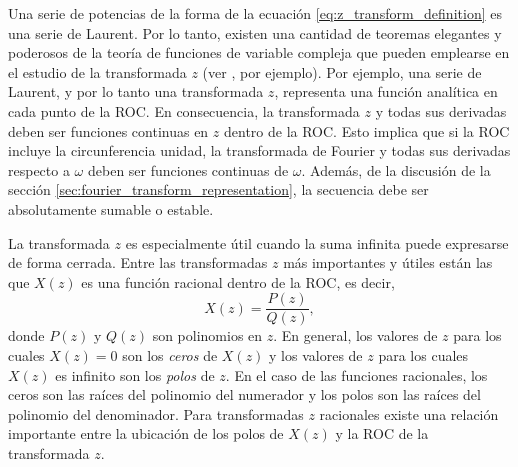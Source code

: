 \documentclass[a4paper]{report}
\begin{document}
Una serie de potencias de la forma de la ecuación \ref{eq:z_transform_definition} es una serie de Laurent. Por lo tanto, existen una cantidad de teoremas elegantes y poderosos de la teoría de funciones de variable compleja que pueden emplearse en el estudio de la transformada \(z\) (ver \cite{brown2013complex}, por ejemplo). Por ejemplo, una serie de Laurent, y por lo tanto una transformada \(z\), representa una función analítica en cada punto de la ROC. En consecuencia, la transformada \(z\) y todas sus derivadas deben ser funciones continuas en \(z\) dentro de la ROC. Esto implica que si la ROC incluye la circunferencia unidad, la transformada de Fourier y todas sus derivadas respecto a \(\omega\) deben ser funciones continuas de \(\omega\). Además, de la discusión de la sección \ref{sec:fourier_transform_representation}, la secuencia debe ser absolutamente sumable o estable.

La transformada \(z\) es especialmente útil cuando la suma infinita puede expresarse de forma cerrada. Entre las transformadas \(z\) más importantes y útiles están las que \(X(z)\) es una función racional dentro de la ROC, es decir,
\[
 X(z)=\frac{P(z)}{Q(z)},
\]
donde \(P(z)\) y \(Q(z)\) son polinomios en \(z\). En general, los valores de \(z\) para los cuales \(X(z)=0\) son los \emph{ceros} de \(X(z)\) y los valores de \(z\) para los cuales \(X(z)\) es infinito son los \emph{polos} de \(z\). En el caso de las funciones racionales, los ceros son las raíces del polinomio del numerador y los polos son las raíces del polinomio del denominador. Para transformadas \(z\) racionales existe una relación importante entre la ubicación de los polos de \(X(z)\) y la ROC de la transformada \(z\).
\end{document}
